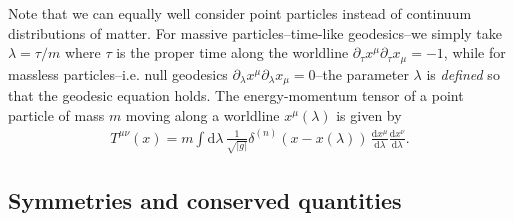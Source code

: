 \documentclass[../geometry_main.tex]{subfiles}
\begin{document}
{\begin{mytheorem}
Note that we can equally well consider point particles instead of continuum distributions of matter.
For massive particles--time-like geodesics--we simply take $\lambda=\tau/m$ where $\tau$ is the proper time along the worldline  $\partial_\tau x^\mu \partial_\tau x_\mu=-1$, while for massless particles--i.e. null geodesics $\partial_\lambda x^\mu \partial_\lambda x_\mu=0$--the parameter $\lambda$ is \emph{defined} so that the geodesic equation holds.
The energy-momentum tensor of a point particle of mass $m$ moving along a worldline $x^\mu(\lambda)$ is given by
\begin{align}
    T^{\mu\nu}(x) = m \int \mathrm{d}\lambda \, \frac{1}{\sqrt{|g|}} \delta^{(n)}(x - x(\lambda)) \, \frac{\mathrm{d}x^\mu}{\mathrm{d}\lambda} \frac{\mathrm{d}x^\nu}{\mathrm{d}\lambda}.
\end{align}
\end{mytheorem}
}



\subsection{Symmetries and conserved quantities}
\end{document}
